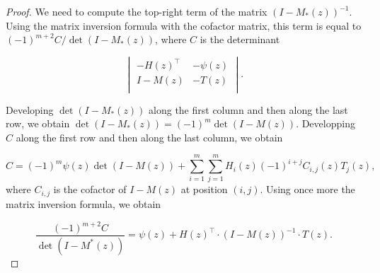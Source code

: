 \documentclass{article}
\begin{document}
\begin{proof}
We need to compute the top-right term of the matrix $(I-M_*(z))^{-1}$.
Using the matrix inversion formula with the cofactor matrix, this term is
equal to $(-1)^{m+2}C/\det(I-M_*(z))$, where $C$ is the determinant

\begin{equation*}
\begin{vmatrix}
-H(z)^\top  & -\psi(z) \\
I-M(z) & -T(z)    \\
\end{vmatrix}.
\end{equation*}

Developing $\det(I-M_*(z))$ along the first column and then along the last
row, we obtain $\det(I-M_*(z)) = (-1)^m\det(I-M(z))$. Developping $C$
along the first row and then along the last column, we obtain

\begin{equation*}
C = (-1)^m\psi(z)\det(I-M(z)) +
\sum_{i=1}^m\sum_{j=1}^m H_i(z) (-1)^{i+j} C_{i,j}(z) T_j(z),
\end{equation*}
where $C_{i,j}$ is the cofactor of $I-M(z)$ at position $(i,j)$. Using
once more the matrix inversion formula, we obtain

\begin{equation*}
\frac{(-1)^{m+2}C}{\det(I-M^*(z))} =
\psi(z) + H(z)^\top \cdot (I-M(z))^{-1} \cdot T(z).
\end{equation*}
\end{proof}
\end{document}
